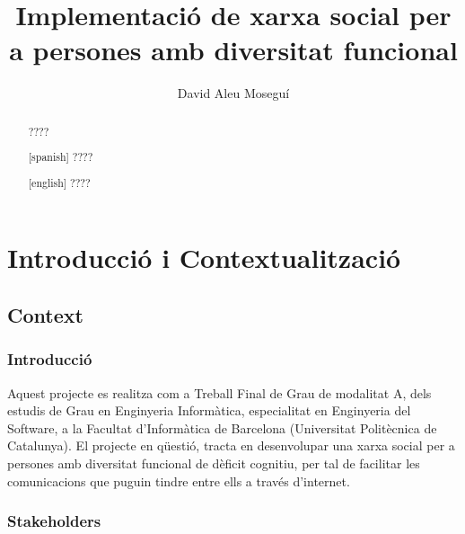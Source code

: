 \documentclass[11pt,catalan,listoffigures,listoftables]{tfgetsinf}
\title{Implementació de xarxa social per a persones amb diversitat funcional}
\author{David Aleu Moseguí}
\begin{document}

\begin{abstract}
????
\end{abstract}
\begin{abstract}[spanish]
????
\end{abstract}
\begin{abstract}[english]
????
\end{abstract}


\mainmatter


\chapter{Introducció i Contextualització}

\section{Context}

\subsection{Introducció}

Aquest projecte es realitza com a Treball Final de Grau de modalitat A, dels estudis de Grau en Enginyeria Informàtica, especialitat en Enginyeria del Software, a la Facultat d’Informàtica de Barcelona (Universitat Politècnica de Catalunya).
El projecte en qüestió, tracta en desenvolupar una xarxa social per a persones amb diversitat funcional de dèficit cognitiu, per tal de facilitar les comunicacions que puguin tindre entre ells a través d’internet.

\subsection{Stakeholders}
\end{document}
